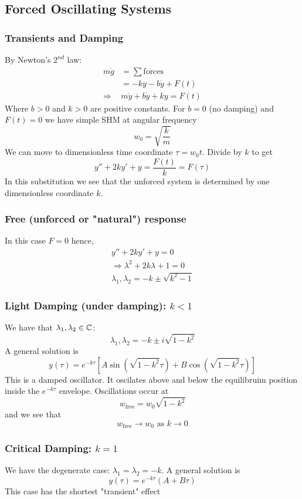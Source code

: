 \documentclass{article}
\begin{document}
\subsection{Forced Oscillating Systems}
\subsubsection*{Transients and Damping}
By Newton's $2^{nd}$ law:
\begin{align*}
    m \ddot{g} &= \sum {\text{forces}} \\
    &= -k y - b\dot{y} + F(t) \\
    \Rightarrow& m \ddot{y} + b \dot{y} + k y = F(t)
\end{align*}
Where $b > 0$ and $k > 0$ are positive constants.
For $b = 0$ (no damping) and $F(t) = 0$ we have simple SHM at angular frequency
\[
    w_0 = \sqrt{\frac{k}{m}}
\]
We can move to dimensionless time coordinate $\tau = w_0 t$. Divide by $k$ to get
\[
    y'' + 2k y' + y = \frac{F(t)}{k} = F(\tau)  
\]
In this substitution we see that the unforced system is determined by one dimensionless coordinate $k$.
\subsubsection{Free (unforced or "natural") response}
In this case $F = 0$ hence,
\begin{align*}
    y'' + 2k y' + y = 0 \\
    \Rightarrow \lambda^2 + 2k \lambda + 1 = 0 \tag{characteristic equation}\\
    \lambda_1, \lambda_2 = -k \pm \sqrt{k^2 - 1}
\end{align*}

\subsubsection*{Light Damping (under damping): $k < 1$}
We have that $\lambda_1, \lambda_2 \in \mathbb{C}$:
\[
    \lambda_1, \lambda_2 = -k \pm i \sqrt{1 - k^2}
\]
A general solution is
\[
    y(\tau) = e^{-k \tau} [A \sin(\sqrt{1 - k^2} \tau) + B \cos (\sqrt{1 - k^2} \tau)]
\]
This is a damped oscillator. It oscilates above and below the equilibruim position inside the $e^{-k\tau}$ envelope.
Oscillations occur at 
\[
    w_{\text{free}} = w_0 \sqrt{1 - k^2}
\]
and we see that
\[
    w_{\text{free}} \rightarrow w_0 \text{ as } k \rightarrow 0
\]
\subsubsection*{Critical Damping: $k = 1$}
We have the degenerate case: $\lambda_1 = \lambda_2 = -k$.
A general solution is
\[
    y(\tau) = e^{-k \tau}(A + B \tau)  
\]
This case has the shortest "transient" effect
\end{document}

